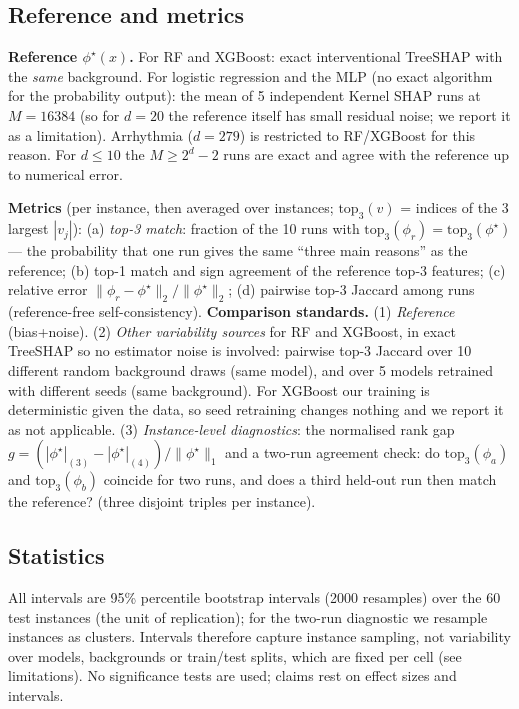 \documentclass{article}
\newcommand{\topk}{\mathrm{top}_3}
\begin{document}
\subsection{Reference and metrics}
\textbf{Reference $\phi^\star(x)$.} For RF and XGBoost: exact interventional TreeSHAP with the \emph{same} background. For logistic regression and the MLP (no exact algorithm for the probability output): the mean of 5 independent Kernel SHAP runs at $M{=}16384$ (so for $d{=}20$ the reference itself has small residual noise; we report it as a limitation). Arrhythmia ($d{=}279$) is restricted to RF/XGBoost for this reason. For $d\le10$ the $M\ge2^d-2$ runs are exact and agree with the reference up to numerical error.

\textbf{Metrics} (per instance, then averaged over instances; $\topk(v)$ = indices of the 3 largest $|v_j|$):
(a) \emph{top-3 match}: fraction of the 10 runs with $\topk(\phi_r)=\topk(\phi^\star)$ --- the probability that one run gives the same ``three main reasons'' as the reference;
(b) top-1 match and sign agreement of the reference top-3 features;
(c) relative error $\|\phi_r-\phi^\star\|_2/\|\phi^\star\|_2$;
(d) pairwise top-3 Jaccard among runs (reference-free self-consistency).
\textbf{Comparison standards.} (1) \emph{Reference} (bias+noise). (2) \emph{Other variability sources} for RF and XGBoost, in exact TreeSHAP so no estimator noise is involved: pairwise top-3 Jaccard over 10 different random background draws (same model), and over 5 models retrained with different seeds (same background). For XGBoost our training is deterministic given the data, so seed retraining changes nothing and we report it as not applicable. (3) \emph{Instance-level diagnostics}: the normalised rank gap $g=(|\phi^\star|_{(3)}-|\phi^\star|_{(4)})/\|\phi^\star\|_1$ and a two-run agreement check: do $\topk(\phi_a)$ and $\topk(\phi_b)$ coincide for two runs, and does a third held-out run then match the reference? (three disjoint triples per instance).

\subsection{Statistics}
All intervals are 95\% percentile bootstrap intervals (2000 resamples) over the 60 test instances (the unit of replication); for the two-run diagnostic we resample instances as clusters. Intervals therefore capture instance sampling, not variability over models, backgrounds or train/test splits, which are fixed per cell (see limitations). No significance tests are used; claims rest on effect sizes and intervals.
\end{document}
